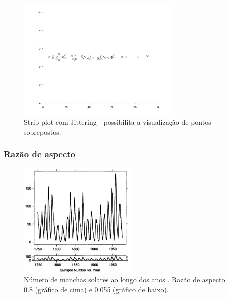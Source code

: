 \begin{frame}
\begin{figure}[h]
 \centering
  \includegraphics[width=0.7\textwidth,height=0.7\textheight,keepaspectratio]{figures/strip2.pdf}
 \caption{Strip plot com Jittering - possibilita a visualização de pontos sobrepostos.}
 \label{fig-strip2}
\end{figure}
\end{frame}


\begin{frame}
\frametitle{Razão de aspecto}

\begin{figure}[h]
 \centering
  \includegraphics[width=0.5\textwidth,height=0.7\textheight,keepaspectratio]{figures/sunspots.png}
 \caption{Número de manchas solares ao longo dos anos \cite{robbins_creating_2013}. Razão de aspecto 0.8 (gráfico de cima) e 0.055 (gráfico de baixo).}
 \label{fig-sunspots}
\end{figure}

\end{frame}


